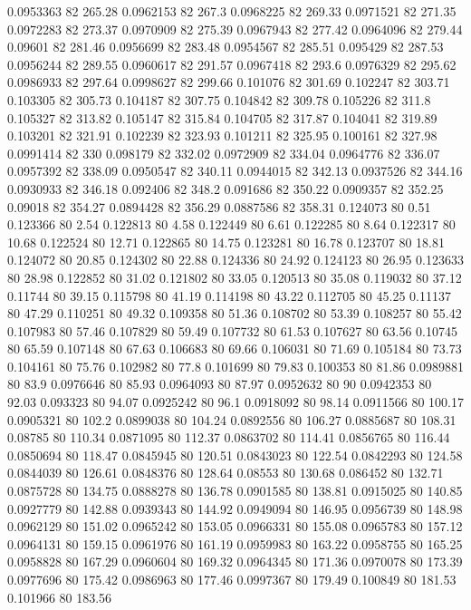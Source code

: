 0.0953363 82 265.28
0.0962153 82 267.3
0.0968225 82 269.33
0.0971521 82 271.35
0.0972283 82 273.37
0.0970909 82 275.39
0.0967943 82 277.42
0.0964096 82 279.44
0.09601 82 281.46
0.0956699 82 283.48
0.0954567 82 285.51
0.095429 82 287.53
0.0956244 82 289.55
0.0960617 82 291.57
0.0967418 82 293.6
0.0976329 82 295.62
0.0986933 82 297.64
0.0998627 82 299.66
0.101076 82 301.69
0.102247 82 303.71
0.103305 82 305.73
0.104187 82 307.75
0.104842 82 309.78
0.105226 82 311.8
0.105327 82 313.82
0.105147 82 315.84
0.104705 82 317.87
0.104041 82 319.89
0.103201 82 321.91
0.102239 82 323.93
0.101211 82 325.95
0.100161 82 327.98
0.0991414 82 330
0.098179 82 332.02
0.0972909 82 334.04
0.0964776 82 336.07
0.0957392 82 338.09
0.0950547 82 340.11
0.0944015 82 342.13
0.0937526 82 344.16
0.0930933 82 346.18
0.092406 82 348.2
0.091686 82 350.22
0.0909357 82 352.25
0.09018 82 354.27
0.0894428 82 356.29
0.0887586 82 358.31
0.124073 80 0.51
0.123366 80 2.54
0.122813 80 4.58
0.122449 80 6.61
0.122285 80 8.64
0.122317 80 10.68
0.122524 80 12.71
0.122865 80 14.75
0.123281 80 16.78
0.123707 80 18.81
0.124072 80 20.85
0.124302 80 22.88
0.124336 80 24.92
0.124123 80 26.95
0.123633 80 28.98
0.122852 80 31.02
0.121802 80 33.05
0.120513 80 35.08
0.119032 80 37.12
0.11744 80 39.15
0.115798 80 41.19
0.114198 80 43.22
0.112705 80 45.25
0.11137 80 47.29
0.110251 80 49.32
0.109358 80 51.36
0.108702 80 53.39
0.108257 80 55.42
0.107983 80 57.46
0.107829 80 59.49
0.107732 80 61.53
0.107627 80 63.56
0.10745 80 65.59
0.107148 80 67.63
0.106683 80 69.66
0.106031 80 71.69
0.105184 80 73.73
0.104161 80 75.76
0.102982 80 77.8
0.101699 80 79.83
0.100353 80 81.86
0.0989881 80 83.9
0.0976646 80 85.93
0.0964093 80 87.97
0.0952632 80 90
0.0942353 80 92.03
0.093323 80 94.07
0.0925242 80 96.1
0.0918092 80 98.14
0.0911566 80 100.17
0.0905321 80 102.2
0.0899038 80 104.24
0.0892556 80 106.27
0.0885687 80 108.31
0.08785 80 110.34
0.0871095 80 112.37
0.0863702 80 114.41
0.0856765 80 116.44
0.0850694 80 118.47
0.0845945 80 120.51
0.0843023 80 122.54
0.0842293 80 124.58
0.0844039 80 126.61
0.0848376 80 128.64
0.08553 80 130.68
0.086452 80 132.71
0.0875728 80 134.75
0.0888278 80 136.78
0.0901585 80 138.81
0.0915025 80 140.85
0.0927779 80 142.88
0.0939343 80 144.92
0.0949094 80 146.95
0.0956739 80 148.98
0.0962129 80 151.02
0.0965242 80 153.05
0.0966331 80 155.08
0.0965783 80 157.12
0.0964131 80 159.15
0.0961976 80 161.19
0.0959983 80 163.22
0.0958755 80 165.25
0.0958828 80 167.29
0.0960604 80 169.32
0.0964345 80 171.36
0.0970078 80 173.39
0.0977696 80 175.42
0.0986963 80 177.46
0.0997367 80 179.49
0.100849 80 181.53
0.101966 80 183.56
